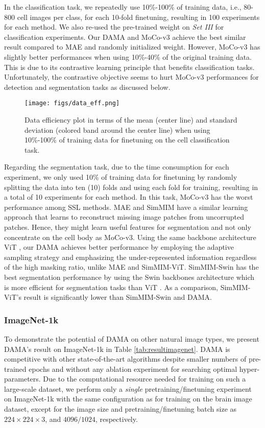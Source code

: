 \documentclass[10pt,twocolumn,letterpaper]{article}
\begin{document}
In the classification task, we repeatedly use 10\%-100\% of training data, i.e., 80-800 cell images per class, for each 10-fold finetuning, resulting in 100 experiments for each method. We also re-used the pre-trained weight on \textit{Set III} for classification experiments. Our DAMA and MoCo-v3 \cite{mocov3} achieve the best similar result compared to MAE \cite{mae} and randomly initialized weight. However, MoCo-v3 has slightly better performances when using 10\%-40\% of the original training data. This is due to its contrastive learning principle that benefits classification tasks. Unfortunately, the contrastive objective seems to hurt MoCo-v3 performances for detection and segmentation tasks as discussed below.

\begin{figure}[]
\centering
\texttt{[image: figs/data\_eff.png]}
\caption{Data efficiency plot in terms of the mean (center line) and standard deviation (colored band around the center line) when using 10\%-100\% of training data for finetuning on the cell classification task.}
\label{fig:dataeff}
\vspace{-10pt}
\end{figure}


Regarding the segmentation task, due to the time consumption for each experiment, we only used 10\% of training data for finetuning by randomly splitting the data into ten (10) folds and using each fold for training, resulting in a total of 10 experiments for each method. In this task, MoCo-v3 has the worst performance among SSL methods. MAE \cite{mae} and SimMIM \cite{simmim} have a similar learning approach that learns to reconstruct missing image patches from uncorrupted patches. Hence, they might learn useful features for segmentation and not only concentrate on the cell body as MoCo-v3. Using the same backbone architecture ViT \cite{vit}, our DAMA achieves better performance by employing the adaptive sampling strategy and emphasizing the under-represented information regardless of the high masking ratio, unlike MAE and SimMIM-ViT. SimMIM-Swin has the best segmentation performance by using the Swin \cite{swin} backbones architecture which is more efficient for segmentation tasks than ViT \cite{swin,simmim}. As a comparison, SimMIM-ViT's result is significantly lower than SimMIM-Swin and DAMA.

\subsubsection{ImageNet-1k} To demonstrate the potential of DAMA on other natural image types, we present DAMA's result on ImageNet-1k \cite{imagenet} in Table \ref{tab:resultimagenet}. DAMA is competitive with other state-of-the-art algorithms despite smaller numbers of pre-trained epochs and without any ablation experiment for searching optimal hyper-parameters. Due to the computational resource needed for training on such a large-scale dataset, we perform only a \textit{single} pretraining/finetuning experiment on ImageNet-1k with the same configuration as for training on the brain image dataset, except for the image size and pretraining/finetuning batch size as $224\times224\times3$, and $4096/1024$, respectively.
\end{document}

